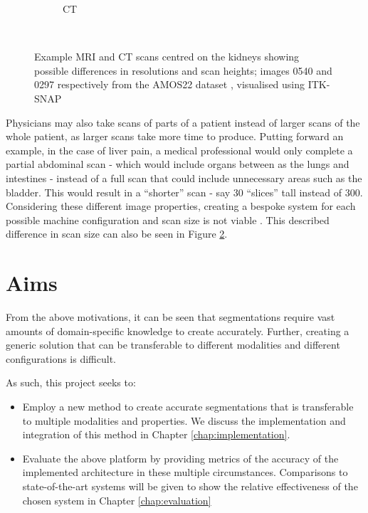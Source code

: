 \documentclass{l4proj}
\begin{document}
\begin{figure}[htb]
\begin{subfigure}[b]{0.45\textwidth}
        \caption{CT}
        \label{fig:ct_scan}
    \end{subfigure}
    ~ %
    \caption{Example MRI and CT scans centred on the kidneys showing possible differences in resolutions and scan heights; images 0540 and 0297 respectively from the AMOS22 dataset \citep{ji2022amos}, visualised using ITK-SNAP \citep{itksnap}
    }\label{fig:ct_and_mri_scans}
\end{figure}

Physicians may also take scans of parts of a patient instead of larger scans of the whole patient, as larger scans take more time to produce. Putting forward an example, in the case of liver pain, a medical professional would only complete a partial abdominal scan - which would include organs between as the lungs and intestines - instead of a full scan that could include unnecessary areas such as the bladder. This would result in a “shorter” scan - say 30 “slices” tall instead of 300. Considering these different image properties, creating a bespoke system for each possible machine configuration and scan size is not viable \citep{ji2022amos}. This described difference in scan size can also be seen in Figure \ref{fig:ct_and_mri_scans}.

\section{Aims}

From the above motivations, it can be seen that segmentations require vast amounts of domain-specific knowledge to create accurately. Further, creating a generic solution that can be transferable to different modalities and different configurations is difficult.

As such, this project seeks to:
\begin{itemize} 
	\item
Employ a new method to create accurate segmentations that is transferable to multiple modalities and properties. We discuss the implementation and integration of this method in Chapter \ref{chap:implementation}.
\item
Evaluate the above platform by providing metrics of the accuracy of the implemented architecture in these multiple circumstances. Comparisons to state-of-the-art systems will be given to show the relative effectiveness of the chosen system in Chapter \ref{chap:evaluation}
\end{itemize}
\end{document}
